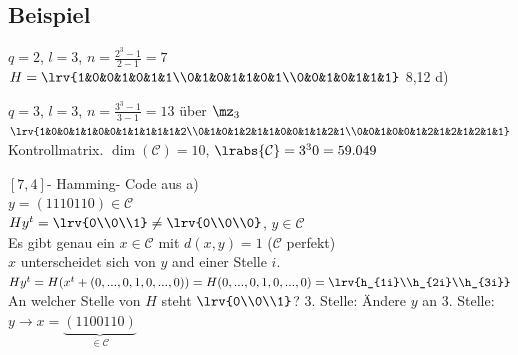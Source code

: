 	\subsection{Beispiel}
		\item $ q=2 $, $ l=3 $, $ n=\frac{2^3-1}{2-1}=7 $\\
		$ H=\lrv{1&0&0&1&0&1&1\\0&1&0&1&1&0&1\\0&0&1&0&1&1&1} $ 8,12 d)
		\item $ q=3 $, $l=3$, $n=\frac{3^3-1}{3-1}=13$ über $ \mz_3 $\\
		$ \lrv{1&0&0&1&1&0&0&1&1&1&1&1&2\\0&1&0&1&2&1&1&0&0&1&1&2&1\\0&0&1&0&0&1&2&1&2&1&2&1&1} $ Kontrollmatrix. $ \dim(\mathcal{C})=10 $, $ \lrabs{\mathcal{C}}=3^30=59.049 $
		\item  $ [7,4] $- Hamming- Code aus a)\\
		$ y=(1110110)\in \mathcal{C} $\\
		$ Hy^t=\lrv{0\\0\\1}\neq\lrv{0\\0\\0} $, $ y\in \mathcal{C} $\\
		Es gibt genau ein $ x\in \mathcal{C} $ mit $ d(x,y)=1 $ ($ \mathcal{C} $ perfekt)\\
		$ x $ unterscheidet sich von $ y $ and einer Stelle $ i $.\\
		$ Hy^t=H(x^t+(0,...,0,1,0,...,0))=H(0,...,0,1,0,...,0)=\lrv{h_{1i}\\h_{2i}\\h_{3i}} $\\
		An welcher Stelle von $ H $ steht $ \lrv{0\\0\\1} $? 3. Stelle: Ändere $ y $ an 3. Stelle: $ y\rightarrow x=\underbrace{(1100110)}_{\in \mathcal{C}} $
	\subExEnd